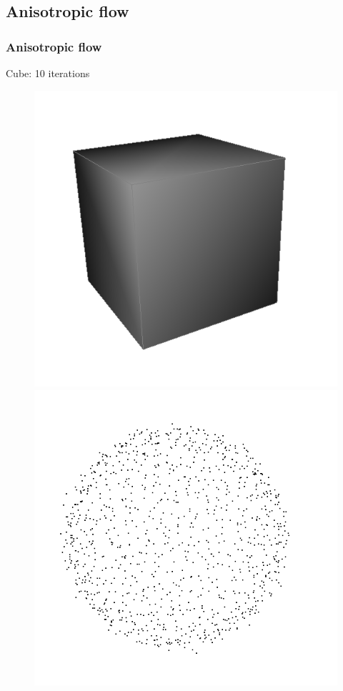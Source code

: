\documentclass{beamer}
\begin{document}
\subsection{Anisotropic flow}
\begin{frame}
    \frametitle{Anisotropic flow}

    Cube: 10 iterations
    \begin{figure}
        \centering
        \includegraphics[scale=0.15]{img/cube}
        \includegraphics[scale=0.15]{img/sphere-025-05-0}

\end{figure}
\end{frame}
\end{document}
